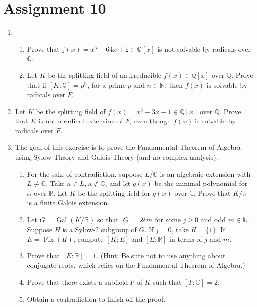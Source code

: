 \documentclass[notoc,notitlepage,nobib]{tufte-book}
\DeclareMathOperator{\Gal}{Gal}
\DeclareMathOperator{\Fix}{Fix}
\begin{document}

\section{Assignment 10}%
\label{sec:assignment_10}

\begin{enumerate}
	\item \begin{enumerate}
      \item Prove that $f(x) = x^5 - 64x + 2 \in \mathbb{Q}[x]$ is not solvable
        by radicals over $\mathbb{Q}$.
      \item Let $K$ be the splitting field of an irreducible $f(x) \in
        \mathbb{Q}[x]$ over $\mathbb{Q}$. Prove that if $[ K : \mathbb{Q} ] =
        p^n$, for a prime $p$ and $n \in \mathbb{N}$, then $f(x)$ is solvable by
        radicals over $F$.
    \end{enumerate}
  \item Let $K$ be the splitting field of $f(x) = x^3 - 3x - 1 \in
    \mathbb{Q}[x]$ over $\mathbb{Q}$. Prove that $K$ is not a radical extension
    of $F$, even though $f(x)$ is solvable by radicals over $F$.
  \item The goal of this exercise is to prove the Fundamental Theorem of
    Algebra using Sylow Theory and Galois Theory (and no complex analysis).
    \label{item:a10q3}
    \begin{enumerate}
      \item For the sake of contradiction, suppose $L / \mathbb{C}$ is an
        algebraic extension with $L \neq \mathbb{C}$. Take $\alpha \in L,
        \alpha \notin \mathbb{C}$, and let $g(x)$ be the minimal polynomial
        for $\alpha$ over $\mathbb{R}$. Let $K$ be the splitting field for
        $g(x)$ over $\mathbb{C}$. Prove that $K / \mathbb{R}$ is a finite
        Galois extension.
      \item Let $G = \Gal(K / \mathbb{R})$ so that $\left|G\right| = 2^j m$ for some
        $j \geq 0$ and odd $m \in \mathbb{N}$. Suppose $H$ is a Sylow-2
        subgroup of $G$. If $j = 0$, take $H = \{1\}$. If $E = \Fix(H)$,
        compute $[K : E]$ and $[E : \mathbb{R}]$ in terms of $j$ and $m$.
      \item Prove that $[E : \mathbb{R}] = 1$. (Hint: Be sure not to use
        anything about conjugate roots, which relies on the Fundamental
        Theorem of Algebra.)
      \item Prove that there exists a subfield $F$ of $K$ such that $[F :
        \mathbb{C}] = 2$.
      \item Obtain a contradiction to finish off the proof.
    \end{enumerate}
\end{enumerate}



\backmatter

\fancyhead[LE]{\thepage \enspace \textsl{\leftmark}}

% 

\printindex
\end{document}
